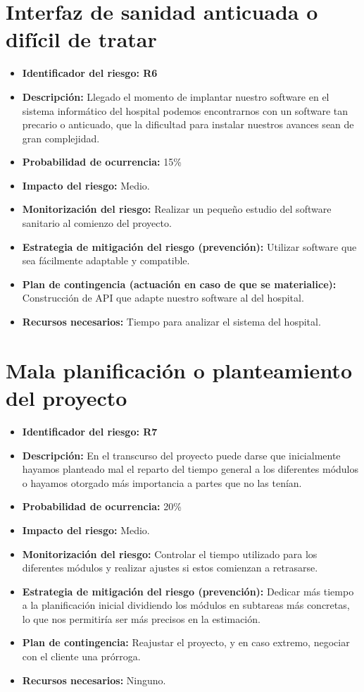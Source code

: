 \section{Interfaz de sanidad anticuada o difícil de tratar}

\begin{itemize}
	\item \textbf{Identificador del riesgo: R6}
	\item \textbf{Descripción: } Llegado el momento de implantar nuestro software en el sistema informático del hospital podemos encontrarnos con un software tan precario o anticuado, que la dificultad para instalar nuestros avances sean de gran complejidad.
	\item \textbf{Probabilidad de ocurrencia: } 15\%
	\item \textbf{Impacto del riesgo: } Medio.
	\item \textbf{Monitorización del riesgo: } Realizar un pequeño estudio del software sanitario al comienzo del proyecto. 
	\item \textbf{Estrategia de mitigación del riesgo (prevención): } Utilizar software que sea fácilmente adaptable y compatible. 
	\item \textbf{Plan de contingencia (actuación en caso de que se materialice): } Construcción de API que adapte nuestro software al del hospital.
	\item \textbf{Recursos necesarios: } Tiempo para analizar el sistema del hospital.
\end{itemize}

\section{Mala planificación o planteamiento del proyecto}

\begin{itemize}
	\item \textbf{Identificador del riesgo: R7}
	\item \textbf{Descripción: } En el transcurso del proyecto puede darse que inicialmente hayamos planteado mal el reparto del tiempo general a los diferentes módulos o hayamos otorgado más importancia a partes que no las tenían.
	\item \textbf{Probabilidad de ocurrencia: } 20\%
	\item \textbf{Impacto del riesgo: } Medio.
	\item \textbf{Monitorización del riesgo: } Controlar el tiempo utilizado para los diferentes módulos y realizar ajustes si estos comienzan a retrasarse.
	\item \textbf{Estrategia de mitigación del riesgo (prevención): } Dedicar más tiempo a la planificación inicial dividiendo los módulos en subtareas más concretas, lo que nos permitiría ser más precisos en la estimación.
	\item \textbf{Plan de contingencia: } Reajustar el proyecto, y en caso extremo, negociar con el cliente una prórroga.
	\item \textbf{Recursos necesarios: } Ninguno.
\end{itemize}


